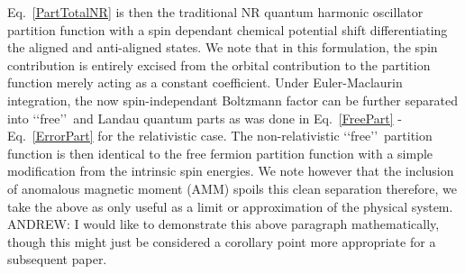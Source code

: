 \documentclass[Universe,article,submit,moreauthors,pdftex]{Definitions/mdpi}
\newcommand*{\req}[1]{Eq.~{\eqref{#1}}}
\begin{document}
\req{PartTotalNR} is then the traditional NR quantum harmonic oscillator partition function with a spin dependant chemical potential shift differentiating the aligned and anti-aligned states. We note that in this formulation, the spin contribution is entirely excised from the orbital contribution to the partition function merely acting as a constant coefficient. Under Euler-Maclaurin integration, the now spin-independant Boltzmann factor can be further separated into \lq\lq free\rq\rq\ and Landau quantum parts as was done in \req{FreePart} - \req{ErrorPart} for the relativistic case. The non-relativistic \lq\lq free\rq\rq\ partition function is then identical to the free fermion partition function with a simple modification from the intrinsic spin energies. We note however that the inclusion of anomalous magnetic moment (AMM) spoils this clean separation therefore, we take the above as only useful as a limit or approximation of the physical system. {\color{red}ANDREW: I would like to demonstrate this above paragraph mathematically, though this might just be considered a corollary point more appropriate for a subsequent paper.}
\end{document}
